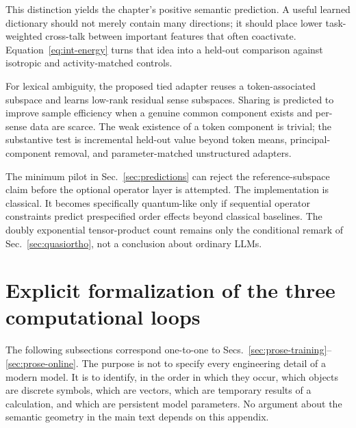 \documentclass[
  aps,
  reprint,
  superscriptaddress,
  floatfix,
  nofootinbib,
  longbibliography
]{revtex4-2}
\begin{document}
This distinction yields the chapter's positive semantic prediction.  A useful
learned dictionary should not merely contain many directions; it should place
lower task-weighted cross-talk between important features that often
coactivate.  Equation~\eqref{eq:int-energy} turns that idea into a held-out
comparison against isotropic and activity-matched controls.

For lexical ambiguity, the proposed tied adapter reuses a token-associated
subspace and learns low-rank residual sense subspaces.  Sharing is predicted to
improve sample efficiency when a genuine common component exists and per-sense
data are scarce.  The weak existence of a token component is trivial; the
substantive test is incremental held-out value beyond token means,
principal-component removal, and parameter-matched unstructured adapters.

The minimum pilot in Sec.~\ref{sec:predictions} can reject the reference-subspace
claim before the optional operator layer is attempted.  The implementation is
classical.  It becomes specifically quantum-like only if sequential operator
constraints predict prespecified order effects beyond classical baselines.
The doubly exponential tensor-product count remains only the conditional
remark of Sec.~\ref{sec:quasiortho}, not a conclusion about ordinary LLMs.

\appendix

\section{Explicit formalization of the three computational loops}
\label{app:llm-loops}

The following subsections correspond one-to-one to
Secs.~\ref{sec:prose-training}--\ref{sec:prose-online}.  The purpose is not to
specify every engineering detail of a modern model.  It is to identify, in the
order in which they occur, which objects are discrete symbols, which are
vectors, which are temporary results of a calculation, and which are persistent
model parameters.  No argument about the semantic geometry in the main text
depends on this appendix.
\end{document}
